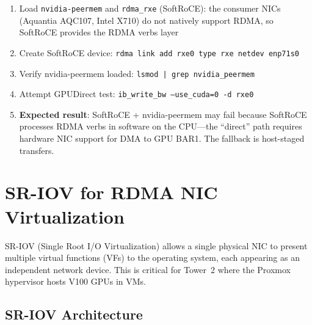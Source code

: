 \documentclass[11pt,letterpaper]{article}
\begin{document}
\begin{enumerate}[noitemsep]
    \item Load \texttt{nvidia-peermem} and \texttt{rdma\_rxe} (SoftRoCE): the consumer NICs (Aquantia AQC107, Intel X710) do not natively support RDMA, so SoftRoCE provides the RDMA verbs layer
    \item Create SoftRoCE device: \texttt{rdma link add rxe0 type rxe netdev enp71s0}
    \item Verify nvidia-peermem loaded: \texttt{lsmod | grep nvidia\_peermem}
    \item Attempt GPUDirect test: \texttt{ib\_write\_bw --use\_cuda=0 -d rxe0}
    \item \textbf{Expected result}: SoftRoCE + nvidia-peermem may fail because SoftRoCE processes RDMA verbs in software on the CPU---the ``direct'' path requires hardware NIC support for DMA to GPU BAR1. The fallback is host-staged transfers.
\end{enumerate}

\section{SR-IOV for RDMA NIC Virtualization}
\label{sec:sriov}

SR-IOV (Single Root I/O Virtualization) allows a single physical NIC to present multiple virtual functions (VFs) to the operating system, each appearing as an independent network device. This is critical for Tower~2 where the Proxmox hypervisor hosts V100 GPUs in VMs.

\subsection{SR-IOV Architecture}
\end{document}
